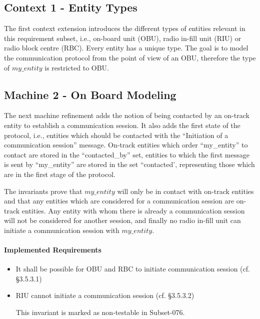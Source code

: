 \documentclass{template/openetcs_article}
\begin{document}


\subsection{Context 1 - Entity Types}
\label{sec:context-1-entity}

The first context extension introduces the different types of entities relevant
in this requirement subset, i.e., on-board unit (OBU), radio in-fill unit (RIU)
or radio block centre (RBC). Every entity has a unique type. The goal is to
model the communication protocol from the point of view of an OBU, therefore the
type of $my\_entity$ is restricted to OBU.



\subsection{Machine 2 - On Board Modeling}
\label{sec:machine-2-board}

The next machine refinement adds the notion of being contacted by an on-track
entity to establish a communication session. It also adds the first state of the
protocol, i.e., entities which should be contacted with the ``Initiation of a
communication session'' message. On-track entities which order ``my\_entity'' to
contact are stored in the ``contacted\_by'' set, entities to which the first
message is sent by ``my\_entity'' are stored in the set ``contacted',
representing those which are in the first stage of the protocol.

The invariants prove that $my\_entity$ will only be in contact with on-track
entities and that any entities which are considered for a communication session
are on-track entities. Any entity with whom there is already a communication
session will not be considered for another session, and finally no radio in-fill
unit can initiate a communication session with $my\_entity$.

\paragraph{Implemented Requirements}
\label{sec:impl-requ-1}

\begin{itemize}
\item It shall be possible for OBU and RBC to initiate communication session
  (cf. §3.5.3.1)
\item RIU cannot initiate a communication session (cf. §3.5.3.2)

This invariant is marked as non-testable in Subset-076.
\end{itemize}
\end{document}
